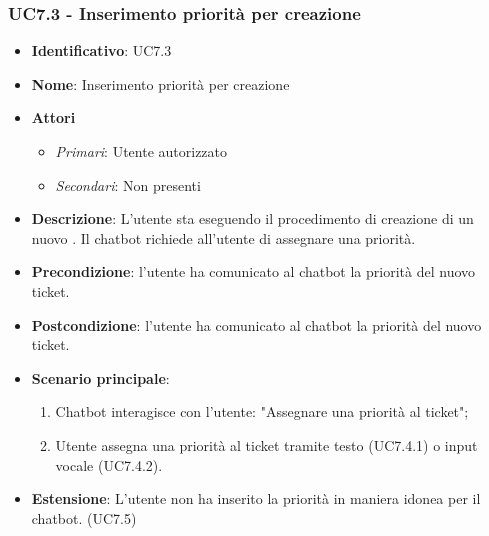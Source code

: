   \subsubsection{UC7.3 - Inserimento priorità per creazione }
\begin{itemize}
	\item \textbf{Identificativo}: UC7.3
	\item \textbf{Nome}: Inserimento priorità per creazione 
	\item \textbf{Attori}
	\begin{itemize} 
		\item \textit{Primari}: Utente autorizzato
		\item \textit{Secondari}: Non presenti
	\end{itemize}
	\item \textbf{Descrizione}: L'utente sta eseguendo il procedimento di creazione di un nuovo . Il chatbot richiede all'utente di assegnare una priorità.
	\item \textbf{Precondizione}: l'utente ha comunicato al chatbot la priorità del nuovo ticket.
	\item \textbf{Postcondizione}: l'utente ha comunicato al chatbot la priorità del nuovo ticket.
	\item \textbf{Scenario principale}: \begin{enumerate}
		\item Chatbot interagisce con l'utente: "Assegnare una priorità al ticket";
		\item Utente assegna una priorità al ticket tramite testo (UC7.4.1) o input vocale (UC7.4.2).
	\end{enumerate}
	\item \textbf{Estensione}: L'utente non ha inserito la priorità in maniera idonea per il chatbot. (UC7.5)
\end{itemize}

